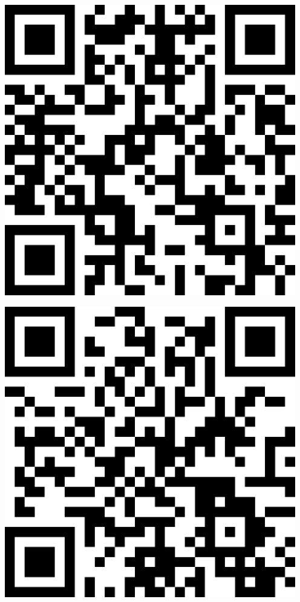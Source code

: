 \documentclass[letterpaper]{article}
\begin{document}
 \endgroup 
 \vspace*{\fill} 
 \pagebreak 
{} 
 \vspace*{\fill} 
 \begingroup 
 \centerline{\includegraphics[scale=1,width=5in,height=5in]{Class3560.png}} 
 \endgroup 
 \vspace*{\fill} 
 \pagebreak 
{} 
 \vspace*{\fill} 
 \begingroup 
 \centerline{\includegraphics[scale=1,width=5in,height=5in]{Class3690.png}} 
\end{document}

